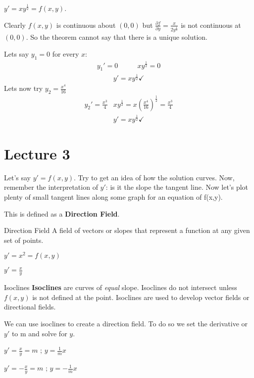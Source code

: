 \begin{example}{}{}
    $y' = xy^{\frac 12} = f(x,y)$. \par
    Clearly $f(x,y)$ is continuous about $(0,0)$ but $\frac{\partial f}{\partial y} = \frac{x}{2y^{\frac 12}}$ is not continuous at $(0,0)$. So the theorem cannot say that there is a unique solution. \par
    Lets say $y_1 = 0$ for every $x$:
    \begin{align*}
        y_1' = 0 \quad & \quad xy^{\frac 12} = 0 
    \end{align*}
    \begin{gather*}
        y' = xy^{\frac 12} \checkmark
    \end{gather*}
    Lets now try $y_2 = \frac{x^4}{16}$
    \begin{align*}
        y_2' = \frac{x^3}{4} & xy^{\frac 12} = x(\frac{x^4}{16})^{\frac 12} = \frac{x^3}{4}
    \end{align*}
    \begin{gather*}
        y' = xy^{\frac 12} \checkmark
    \end{gather*}
\end{example}

\section{Lecture 3}
Let's say $y'=f(x,y)$. Try to get an idea of how the solution curves. Now, remember the interpretation of $y'$: is it the slope the tangent line. Now let's plot plenty of small tangent lines along some graph for an equation of f(x,y).


This is defined as a \textbf{Direction Field}.

\begin{definition}{Direction Field}{}
    A field of vectors or slopes that represent a function at any given set of points.
\end{definition}

\begin{example}{$y'=x^2=f(x,y)$}{}
    
\end{example}

\begin{example}{$y'=\frac xy$}{}

\end{example}

\begin{definition}{Isoclines}{}
    \textbf{Isoclines} are curves of \emph{equal} slope. Isoclines do not intersect unless $f(x,y)$ is not defined at the point. Isoclines are used to develop vector fields or directional fields.
\end{definition}

We can use isoclines to create a direction field. To do so we set the derivative or $y'$ to m and solve for $y$.

\begin{example}{$y'=\frac xy=m$ ; $y=\frac 1m x$}{}
    
\end{example}

\begin{example}{$y'=-\frac xy=m$ ; $y=-\frac 1m x$}{}
    
\end{example}